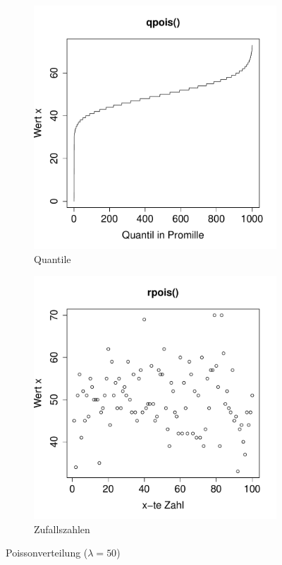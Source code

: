 \begin{figure}[h!]
\begin{subfigure}[b]{0.48\textwidth}
\includegraphics{verteilungen-033}
\caption{Quantile}
\end{subfigure}
\begin{subfigure}[b]{0.48\textwidth}
\includegraphics{verteilungen-034}
\caption{Zufallszahlen}
\end{subfigure}
\caption{Poissonverteilung ($\lambda=50$)}
\end{figure}

